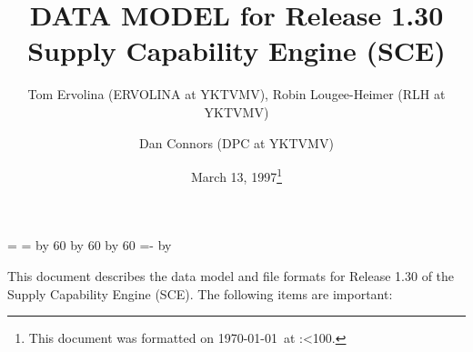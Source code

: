 \topmargin 0.0in
\headheight 0.0in
\headsep 0.0in
\textwidth 7.5in
\oddsidemargin -0.5in
\textheight 9in
\newcount\hh
\newcount\mm

\mm=\time
\hh=\time
\divide\hh by 60
\divide\mm by 60
\multiply\mm by 60
\mm=-\mm
\advance\mm by \time
\def\hhmm{\number\hh:\ifnum\mm<10{}0\fi\number\mm}


\title{DATA MODEL for Release 1.30  Supply Capability Engine (SCE)}
\author{Tom Ervolina (ERVOLINA at YKTVMV), 
Robin Lougee-Heimer (RLH at YKTVMV) \and Dan Connors  (DPC at YKTVMV)}
\date{March 13, 1997\footnote[2]{This document was 
formatted on \today\ at \hhmm.}}
\maketitle
This document describes the data model and file formats 
for Release 1.30 of the Supply Capability 
Engine (SCE).  The following items are important:

